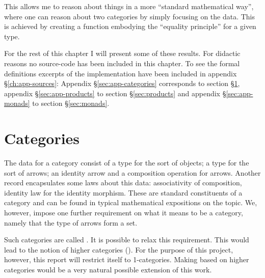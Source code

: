 This allows me to reason about things in a more ``standard mathematical way'',
where one can reason about two categories by simply focusing on the data. This
is achieved by creating a function embodying the ``equality principle'' for a
given type.

For the rest of this chapter I will present some of these results. For didactic
reasons no source-code has been included in this chapter. To see the formal
definitions excerpts of the implementation have been included in appendix
\S\ref{ch:app-sources}:
Appendix
\S\ref{sec:app-categories} corresponds to section \S\ref{sec:categories},
appendix \S\ref{sec:app-products} to section \S\ref{sec:products}
and appendix \S\ref{sec:app-monads} to section \S\ref{sec:monads}.


\section{Categories}
\label{sec:categories}
The data for a category consist of a type for the sort of objects; a type for
the sort of arrows; an identity arrow and a composition operation for arrows.
Another record encapsulates some laws about this data: associativity of
composition, identity law for the identity morphism. These are standard
constituents of a category and can be found in typical mathematical expositions
on the topic. We, however, impose one further requirement on what it means to be
a category, namely that the type of arrows form a set.

Such categories are called . It is possible to relax this
requirement. This would lead to the notion of higher categories (\cite[p.
  307]{hott-2013}). For the purpose of this project, however, this report will
restrict itself to 1-categories. Making based on higher categories would be a
very natural possible extension of this work.

